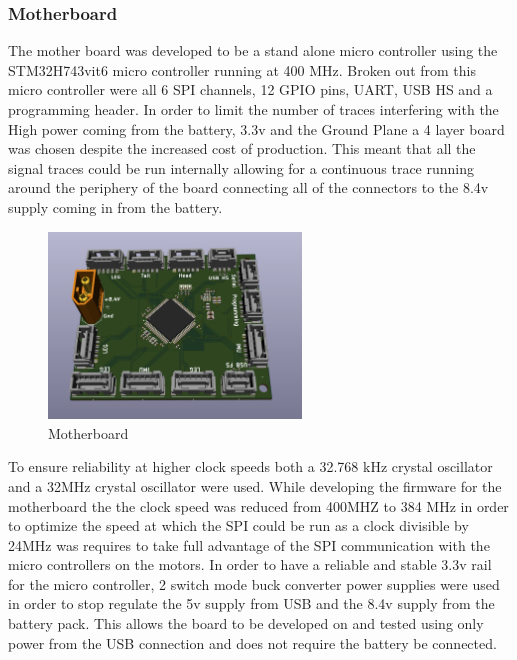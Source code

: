 \subsubsection{Motherboard}
The mother board was developed to be a stand alone micro controller using the STM32H743vit6 micro controller running at 400 MHz. Broken out from this micro controller were all 6 SPI channels, 12 GPIO pins, UART, USB HS and a programming header. In order to limit the number of traces interfering with the High power  coming from the battery, 3.3v and the Ground Plane a 4 layer board was chosen despite the increased cost of production. This meant that all the signal traces could be run internally allowing for a continuous trace running around the periphery of the board connecting all of the connectors to the 8.4v supply coming in from the battery.
\begin{figure}[H]
       \centering
       \includegraphics[width=0.6\textwidth]{figures/Motherboard_Rev2.png}
       \caption{Motherboard}
       \label{fig:MotherboardPCB}
   \end{figure}
To ensure reliability at higher clock speeds both a 32.768 kHz crystal oscillator and a 32MHz crystal oscillator were used. While developing the firmware for the motherboard the the clock speed was reduced from 400MHZ to 384 MHz in order to optimize the speed at which the SPI could be run as a clock divisible by 24MHz was requires to take full advantage of the SPI communication with the micro controllers on the motors. In order to have a reliable and stable 3.3v rail for the micro controller, 2 switch mode buck converter power supplies were used in order to stop regulate the 5v supply from USB and the 8.4v supply from the battery pack. This allows the board to be developed on and tested using only power from the USB connection and does not require the battery be connected. 
  
